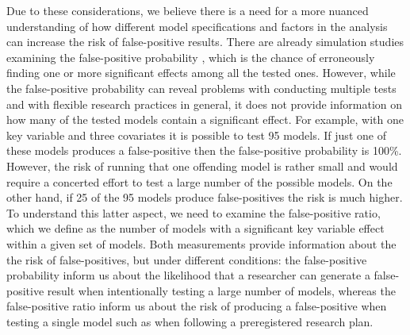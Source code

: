 Due to these considerations, we believe there is a need for a more nuanced understanding of how different model specifications and factors in the analysis can increase the risk of false-positive results. There are already simulation studies examining the false-positive probability \citep{Simmons2011}, which is the chance of erroneously finding one or more significant effects among all the tested ones. However, while the false-positive probability can reveal problems with conducting multiple tests and with flexible research practices in general, it does not provide information on how many of the tested models contain a significant effect. For example, with one key variable and three covariates it is possible to test 95 models. If just one of these models produces a false-positive then the false-positive probability is 100\%. However, the risk of running that one offending model is rather small and would require a concerted effort to test a large number of the possible models. On the other hand, if 25 of the 95 models produce false-positives the risk is much higher. To understand this latter aspect, we need to examine the false-positive ratio, which we define as the number of models with a significant key variable effect within a given set of models. Both measurements provide information about the the risk of false-positives, but under different conditions: the false-positive probability inform us about the likelihood that a researcher can generate a false-positive result when intentionally testing a large number of models, whereas the false-positive ratio inform us about the risk of producing a false-positive when testing a single model such as when following a preregistered research plan. \\

